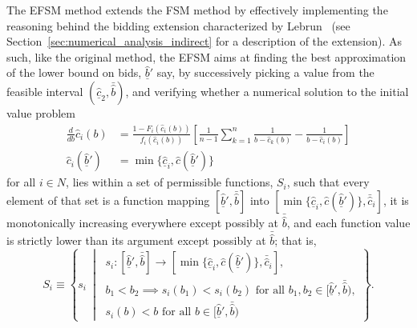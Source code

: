 The EFSM method extends the FSM method by effectively implementing the reasoning behind the bidding extension characterized by Lebrun~\cite{Lebrun2006} (see Section~\ref{sec:numerical_analysis_indirect} for a description of the extension). As such, like the original method, the EFSM aims at finding the best approximation of the lower bound on bids, $\underline{\hat{b}}'$ say, by successively picking a value from the feasible interval $(\underline{\hat{c}}_2,\bar{\hat{b}})$, and verifying whether a numerical solution to the initial value problem
\begin{equation}
  \label{eq:efsm_initial_value_problem_indirect}
  \begin{array}{ll}
    \displaystyle\frac{d}{db}\hat{c}_i(b) &= \displaystyle\frac{1 - F_i(\hat{c}_i(b))}{f_i(\hat{c}_i(b))}\left[ \frac{1}{n-1}\sum_{k=1}^n\frac{1}{b - \hat{c}_k(b)} - \frac{1}{b - \hat{c}_i(b)} \right] \\[2ex]
    \hat{c}_i(\underline{\hat{b}}') &= \min\{\underline{\hat{c}}_i, \hat{c}(\underline{\hat{b}}')\}
  \end{array}
\end{equation}
for all $i\in N$, lies within a set of permissible functions, $S_i$, such that every element of that set is a function mapping $[\underline{\hat{b}}',\bar{\hat{b}}]$ into $[\min\{\underline{\hat{c}}_i, \hat{c}(\underline{\hat{b}}')\}, \bar{\hat{c}}_i]$, it is monotonically increasing everywhere except possibly at $\bar{\hat{b}}$, and each function value is strictly lower than its argument except possibly at $\bar{\hat{b}}$; that is,
\begin{equation*}
  S_i\equiv\left\{s_i \:\middle\vert\:
  \begin{array}{l}
    s_i: [\underline{\hat{b}}', \bar{\hat{b}}]\to [\min\{\underline{\hat{c}}_i, \hat{c}(\underline{\hat{b}}')\}, \bar{\hat{c}}_i],\\
    b_1 < b_2\implies s_i(b_1) < s_i(b_2) \textrm{ for all }b_1,b_2\in [\underline{\hat{b}}', \bar{\hat{b}}),\\
    s_i(b) < b \textrm{ for all }b\in [\underline{\hat{b}}', \bar{\hat{b}})
  \end{array}
  \right\}.
\end{equation*}

